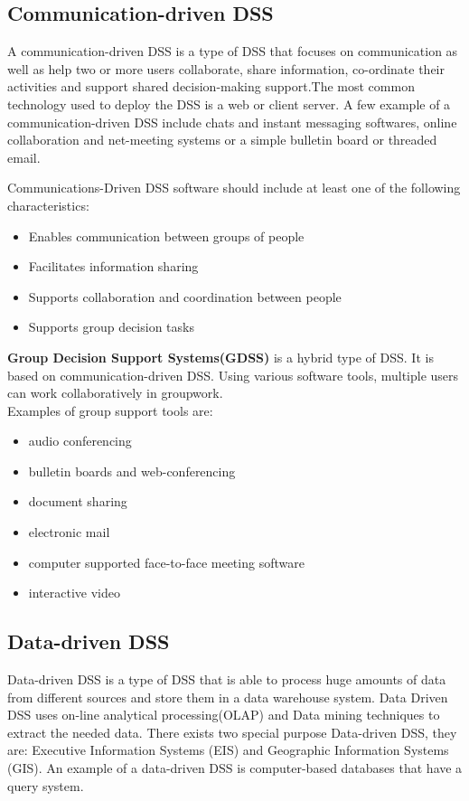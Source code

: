 \subsection{Communication-driven DSS}
\label{subsec:CommunicationDrivenDSS}
\indent A communication-driven DSS is a type of DSS that focuses on communication as well as help two or more users collaborate, share information, co-ordinate their activities and support shared decision-making support.\cite{DDSTypes}The most common technology used to deploy the DSS is a web or client server. A few example of a communication-driven DSS include chats and instant messaging softwares, online collaboration and net-meeting systems or a simple bulletin board or threaded email.

\indent Communications-Driven DSS software should include at least one of the following characteristics:
\begin{itemize}
	\item Enables communication between groups of people
	\item Facilitates information sharing
	\item Supports collaboration and coordination between people
	\item Supports group decision tasks
\end{itemize}
\textbf{Group Decision Support Systems(GDSS)} is a hybrid type of DSS. It is based on communication-driven DSS. Using various software tools, multiple users can work collaboratively in groupwork.\cite{DDSTypes}\\
Examples of group support tools are: 
\begin{itemize}
	\item audio conferencing
	\item bulletin boards and web-conferencing
	\item document sharing
	\item electronic mail
	\item computer supported face-to-face meeting software 
	\item interactive video
\end{itemize}
\subsection{Data-driven DSS}
\label{subsec:DataDrivenDSS}
\indent Data-driven DSS is a type of DSS that is able to process huge amounts of data from different sources and store them in a data warehouse system. Data Driven DSS uses on-line analytical processing(OLAP) and Data mining techniques to extract the needed data.\cite{DDSTypes} There exists two special purpose Data-driven DSS, they are: Executive Information Systems (EIS) and Geographic Information Systems (GIS). An example of a data-driven DSS is computer-based databases that have a query system.


